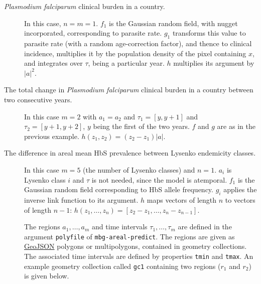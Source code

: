 \begin{description}
    \item[\emph{Plasmodium falciparum} clinical burden in a country.] In this case, $n=m=1$. $f_1$ is the Gaussian random field, with nugget incorporated, corresponding to parasite rate. $g_1$ transforms this value to parasite rate (with a random age-correction factor), and thence to clinical incidence, multiplies it by the population density of the pixel containing $x$, and integrates over $\tau$, being a particular year. $h$ multiplies its argument by $|a|^2$.
    \item[The total change in \emph{Plasmodium falciparum} clinical burden in a country between two consecutive years.] In this case $m=2$ with $a_1=a_2$ and $\tau_1=[y,y+1]$ and $\tau_2=[y+1,y+2]$, $y$ being the first of the two years. $f$ and $g$ are as in the previous example. $h(z_1,z_2)=(z_2-z_1)|a|$.
    \item[The difference in areal mean HbS prevalence between Lysenko endemicity classes.] In this case $m=5$ (the number of Lysenko classes) and $n=1$. $a_i$ is Lysenko class $i$ and $\tau$ is not needed, since the model is atemporal. $f_1$ is the Gaussian random field corresponding to HbS allele frequency. $g_i$ applies the inverse link function to its argument. $h$ maps vectors of length $n$ to vectors of length $n-1$: $h(z_1,\ldots,z_n)=[z_2-z_1,\ldots,z_n-z_{n-1}]$.
    
The regions $a_1,\ldots,a_m$ and time intervals $\tau_1,\ldots,\tau_m$ are defined in the argument \texttt{polyfile} of \texttt{mbg-areal-predict}. The regions are given as \href{http://geojson.org/geojson-spec.html}{GeoJSON} polygons or multipolygons, contained in geometry collections. The associated time intervals are defined by properties \texttt{tmin} and \texttt{tmax}. An example geometry collection called \texttt{gc1} containing two regions ($r_1$ and $r_2$) is given below.
\end{description}
